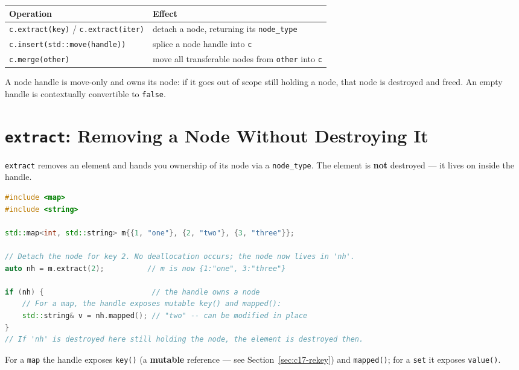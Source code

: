 \begin{center}
\begin{tabular}{ll}
\hline
\textbf{Operation} & \textbf{Effect} \\
\hline
\texttt{c.extract(key)} / \texttt{c.extract(iter)} & detach a node, returning its \texttt{node\_type} \\
\texttt{c.insert(std::move(handle))} & splice a node handle into \texttt{c} \\
\texttt{c.merge(other)} & move all transferable nodes from \texttt{other} into \texttt{c} \\
\hline
\end{tabular}
\end{center}

A node handle is move-only and owns its node: if it goes out of scope still holding a node, that node is destroyed and freed. An empty handle is contextually convertible to \texttt{false}.

\section{\texttt{extract}: Removing a Node Without Destroying It}
\label{sec:c17-extract}

\texttt{extract} removes an element and hands you ownership of its node via a \texttt{node\_type}. The element is \textbf{not} destroyed --- it lives on inside the handle.

\begin{lstlisting}[language=C++,caption={extract detaches a node without destroying its element}]
#include <map>
#include <string>

std::map<int, std::string> m{{1, "one"}, {2, "two"}, {3, "three"}};

// Detach the node for key 2. No deallocation occurs; the node now lives in 'nh'.
auto nh = m.extract(2);          // m is now {1:"one", 3:"three"}

if (nh) {                         // the handle owns a node
    // For a map, the handle exposes mutable key() and mapped():
    std::string& v = nh.mapped(); // "two" -- can be modified in place
}
// If 'nh' is destroyed here still holding the node, the element is destroyed then.
\end{lstlisting}

For a \texttt{map} the handle exposes \texttt{key()} (a \textbf{mutable} reference --- see Section~\ref{sec:c17-rekey}) and \texttt{mapped()}; for a \texttt{set} it exposes \texttt{value()}.

